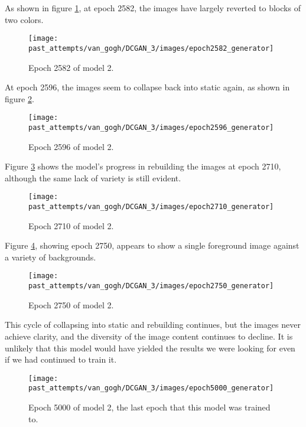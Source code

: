 \documentclass[11pt,letterpaper]{article}
\begin{document}
				As shown in figure \ref{fig:cgvg:epoch2582generator}, at epoch 2582, the images have largely reverted to blocks of two colors.
				\begin{figure}
					\centering
					\texttt{[image: past\_attempts/van\_gogh/DCGAN\_3/images/epoch2582\_generator]}
					\caption{Epoch 2582 of model 2.}
					\label{fig:cgvg:epoch2582generator}
				\end{figure}

				At epoch 2596, the images seem to collapse back into static again, as shown in figure \ref{fig:cgvg:epoch2596generator}.
				\begin{figure}
					\centering
					\texttt{[image: past\_attempts/van\_gogh/DCGAN\_3/images/epoch2596\_generator]}
					\caption{Epoch 2596 of model 2.}
					\label{fig:cgvg:epoch2596generator}
				\end{figure}

				Figure \ref{fig:cgvg:epoch2710generator} shows the model's progress in rebuilding the images at epoch 2710, although the same lack of variety is still evident.
				\begin{figure}
					\centering
					\texttt{[image: past\_attempts/van\_gogh/DCGAN\_3/images/epoch2710\_generator]}
					\caption{Epoch 2710 of model 2.}
					\label{fig:cgvg:epoch2710generator}
				\end{figure}

				Figure \ref{fig:cgvg:epoch2750generator}, showing epoch 2750, appears to show a single foreground image against a variety of backgrounds.
				\begin{figure}
					\centering
					\texttt{[image: past\_attempts/van\_gogh/DCGAN\_3/images/epoch2750\_generator]}
					\caption{Epoch 2750 of model 2.}
					\label{fig:cgvg:epoch2750generator}
				\end{figure}

				This cycle of collapsing into static and rebuilding continues, but the images never achieve clarity, and the diversity of the image content continues to decline.
				It is unlikely that this model would have yielded the results we were looking for even if we had continued to train it.
				\begin{figure}
					\centering
					\texttt{[image: past\_attempts/van\_gogh/DCGAN\_3/images/epoch5000\_generator]}
					\caption{Epoch 5000 of model 2, the last epoch that this model was trained to.}
					\label{fig:cgvg:epoch5000generator}
				\end{figure}
\end{document}
